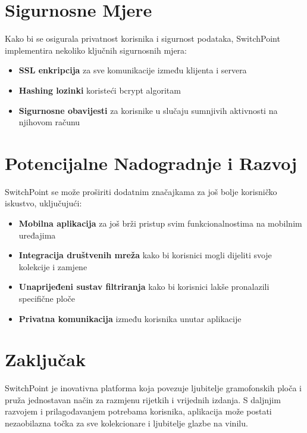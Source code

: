 \section{Sigurnosne Mjere}

Kako bi se osigurala privatnost korisnika i sigurnost podataka, SwitchPoint implementira nekoliko ključnih sigurnosnih mjera:

\begin{itemize}
	\item \textbf{SSL enkripcija} za sve komunikacije između klijenta i servera
	\item \textbf{Hashing lozinki} koristeći bcrypt algoritam
	\item \textbf{Sigurnosne obavijesti} za korisnike u slučaju sumnjivih aktivnosti na njihovom računu
\end{itemize}

\section{Potencijalne Nadogradnje i Razvoj}

SwitchPoint se može proširiti dodatnim značajkama za još bolje korisničko iskustvo, uključujući:

\begin{itemize}
	\item \textbf{Mobilna aplikacija} za još brži pristup svim funkcionalnostima na mobilnim uređajima
	\item \textbf{Integracija društvenih mreža} kako bi korisnici mogli dijeliti svoje kolekcije i zamjene
	\item \textbf{Unaprijeđeni sustav filtriranja} kako bi korisnici lakše pronalazili specifične ploče
	\item \textbf{Privatna komunikacija} između korisnika unutar aplikacije
\end{itemize}

\section{Zaključak}

SwitchPoint je inovativna platforma koja povezuje ljubitelje gramofonskih ploča i pruža jednostavan način za razmjenu rijetkih i vrijednih izdanja. S daljnjim razvojem i prilagođavanjem potrebama korisnika, aplikacija može postati nezaobilazna točka za sve kolekcionare i ljubitelje glazbe na vinilu.



	   	


